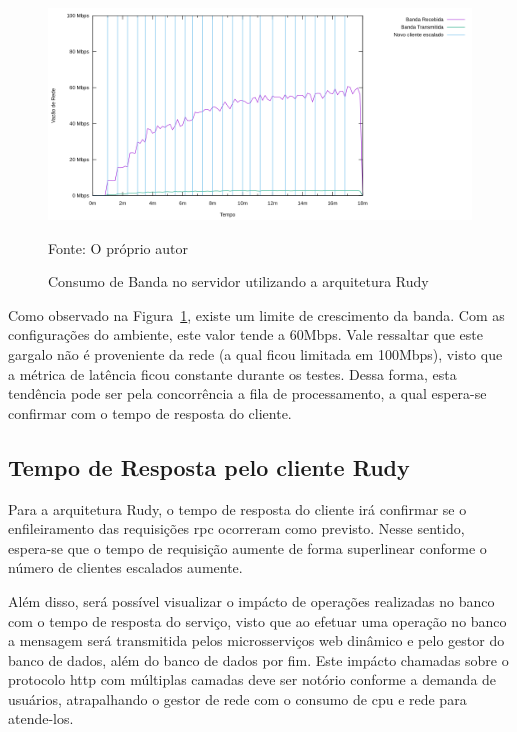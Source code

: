 \begin{figure}[htb!]
    \caption{Consumo de Banda no servidor utilizando a arquitetura Rudy}
    \label{fig:rudy_t4_io}
    \includegraphics[width=\textwidth]{metricas_rudy_t4/io.png}
    \centering
    
    Fonte: O próprio autor
\end{figure}

Como observado na Figura~\ref{fig:rudy_t4_io}, existe um limite de crescimento da banda.
%
Com as configurações do ambiente, este valor tende a 60Mbps.
%
Vale ressaltar que este gargalo não é proveniente da rede (a qual ficou limitada em 100Mbps), visto que a métrica de latência ficou constante durante os testes.
%
Dessa forma, esta tendência pode ser pela concorrência a fila de processamento, a qual espera-se confirmar com o tempo de resposta do cliente.

\subsection{Tempo de Resposta pelo cliente Rudy}

Para a arquitetura Rudy, o tempo de resposta do cliente irá confirmar se o enfileiramento das requisições \ac{rpc} ocorreram como previsto.
%
Nesse sentido, espera-se que o tempo de requisição aumente de forma superlinear conforme o número de clientes escalados aumente.


Além disso, será possível visualizar o impácto de operações realizadas no banco com o tempo de resposta do serviço, visto que ao efetuar uma operação no banco a mensagem será transmitida pelos microsserviços web dinâmico e pelo gestor do banco de dados, além do banco de dados por fim.
%
Este impácto chamadas sobre o protocolo \ac{http} com múltiplas camadas deve ser notório conforme a demanda de usuários, atrapalhando o gestor de rede com o consumo de \ac{cpu} e rede para atende-los.

